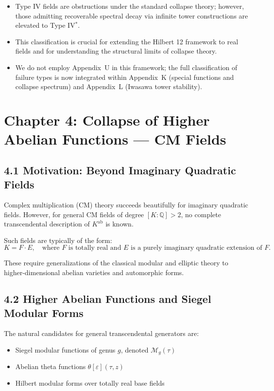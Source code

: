 \documentclass[11pt]{article}
\begin{document}
\begin{itemize}
  \item Type IV fields are obstructions under the standard collapse theory; however, those admitting recoverable spectral decay via infinite tower constructions are elevated to Type IV$^{\ast}$.
  \item This classification is crucial for extending the Hilbert 12 framework to real fields and for understanding the structural limits of collapse theory.
  \item We do not employ Appendix~U in this framework; the full classification of failure types is now integrated within Appendix~K (special functions and collapse spectrum) and Appendix~L (Iwasawa tower stability).
\end{itemize}



\section{Chapter 4: Collapse of Higher Abelian Functions — CM Fields}

\subsection{4.1 Motivation: Beyond Imaginary Quadratic Fields}

Complex multiplication (CM) theory succeeds beautifully for imaginary quadratic fields.  
However, for general CM fields of degree \( [K:\mathbb{Q}] > 2 \), no complete transcendental description of \( K^{\mathrm{ab}} \) is known.

Such fields are typically of the form:
\[
K = F \cdot E, \quad \text{where } F \text{ is totally real and } E \text{ is a purely imaginary quadratic extension of } F.
\]

These require generalizations of the classical modular and elliptic theory to higher-dimensional abelian varieties and automorphic forms.

\subsection{4.2 Higher Abelian Functions and Siegel Modular Forms}

The natural candidates for general transcendental generators are:
\begin{itemize}
    \item Siegel modular functions of genus \( g \), denoted \( \mathcal{M}_g(\tau) \)
    \item Abelian theta functions \( \theta[\varepsilon](\tau, z) \)
    \item Hilbert modular forms over totally real base fields
\end{itemize}
\end{document}
